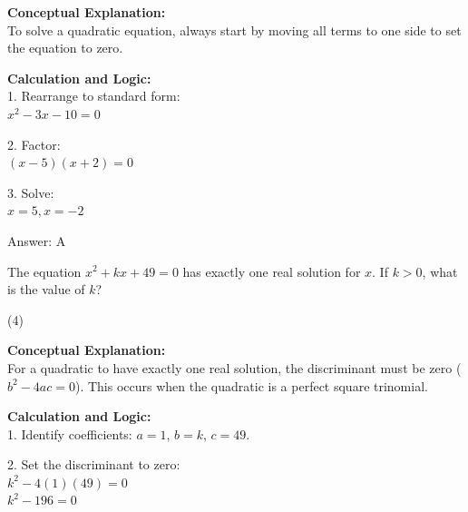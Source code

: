 \documentclass[11pt,paper=a4,answers]{exam}
\begin{document}
\begin{questions}
\begin{solution}
\textbf{Conceptual Explanation:} \\
To solve a quadratic equation, always start by moving all terms to one side to set the equation to zero.

\vspace{15pt}

\textbf{Calculation and Logic:} \\
1. Rearrange to standard form: \\
   $x^2 - 3x - 10 = 0$

\vspace{10pt}

2. Factor: \\
   $(x - 5)(x + 2) = 0$

\vspace{10pt}

3. Solve: \\
   $x = 5, x = -2$

\vspace{20pt}

Answer: \colorbox{yellow!100}{A}
\end{solution}


\question
The equation $x^2 + kx + 49 = 0$ has exactly one real solution for $x$. If $k > 0$, what is the value of $k$?
\begin{tasks}(4)
\end{tasks}

\begin{solution}
\textbf{Conceptual Explanation:} \\
For a quadratic to have exactly one real solution, the discriminant must be zero ($b^2 - 4ac = 0$). This occurs when the quadratic is a perfect square trinomial.

\vspace{15pt}

\textbf{Calculation and Logic:} \\
1. Identify coefficients: $a = 1$, $b = k$, $c = 49$.

\vspace{10pt}

2. Set the discriminant to zero: \\
   $k^2 - 4(1)(49) = 0$ \\
   $k^2 - 196 = 0$


\end{solution}
\end{questions}
\end{document}
